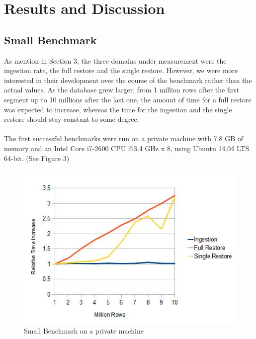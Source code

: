 \documentclass[11pt,singlecolumn]{scrartcl}
\begin{document}
\clearpage


\section{Results and Discussion}
\subsection{Small Benchmark}As mention in Section 3, the three domains under measurement were the ingestion rate, the full restore and the single restore. However, we were more interested in their development over the course of the benchmark rather than the actual values. As the database grew larger, from 1 million rows after the first segment up to 10 millions after the last one, the amount of time for a full restore was expected to increase, whereas the time for the ingestion and the single restore should stay constant to some degree.\\\\The first successful benchmarks were run on a private machine with 7.8 GB of memory and an Intel Core i7-2600 CPU @3.4 GHz x 8, using Ubuntu 14.04 LTS 64-bit. (See Figure 3)

\begin{figure}[h]
\includegraphics[scale=1.1]{loc.jpg}
\caption{Small Benchmark on a private machine}
\end{figure}
\end{document}
